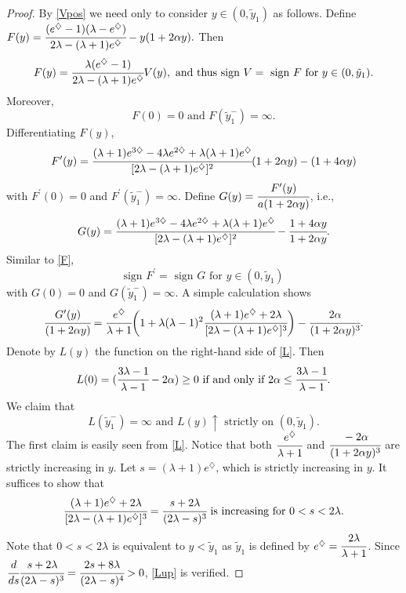 \documentclass[11pt]{article}
\begin{document}
\begin{proof}
By  \eqref{Vpos} we need only to consider  $y \in (0, \tilde y_1)$
as follows. Define $F(y)  =\cfrac{(
e^{\diamondsuit}-1)(\lambda-e^{\diamondsuit}) }{2 \lambda
-(\lambda+1)e^{\diamondsuit}}-y(1+2\alpha y).$ Then
\begin{equation}\label{F}
F(y)  = \cfrac{\lambda ( e^{\diamondsuit}-1)}{2 \lambda
-(\lambda+1)e^{\diamondsuit} } V(y),  \mbox{  and thus sign }V
=\mbox{ sign }F \mbox{ for } y \in (0, \tilde y_1).
\end{equation}
Moreover,
\begin{equation}\label{F0}
F(0)=0 \mbox{ and } F(\tilde y_1^{-}) = \infty.
\end{equation}
Differentiating $F(y)$,
$$
F^\prime(y)=\cfrac{(\lambda+1)e^{3\diamondsuit}-4\lambda
e^{2\diamondsuit}+\lambda(\lambda+1)e^{\diamondsuit}}{[2\lambda-(\lambda+1)e^{\diamondsuit}]^2}(1+2\alpha
y)-(1+4\alpha y)
$$
with $F^{\prime}(0)=0$ and $F^{\prime}(\tilde y_1^{-}) = \infty$.
Define $G(y)= \cfrac{F^{\prime}(y)}{a(1+2\alpha y)}$, i.e.,
\begin{equation}\label{G}
G(y)  =\cfrac{(\lambda+1)e^{3\diamondsuit}-4\lambda
e^{2\diamondsuit}+\lambda(\lambda+1)e^{\diamondsuit}}{[2\lambda-(\lambda+1)e^{\diamondsuit}]^2}-\cfrac{1+4\alpha
y}{1+2\alpha y}.
\end{equation}
Similar to  \eqref{F},
\begin{equation}\label{signG}
\mbox{sign }F^{\prime} =\mbox{ sign }G   \mbox{ for } y \in (0, \tilde y_1)
\end{equation}
with $G(0)=0$ and $G(\tilde y_1^{-}) = \infty$. A simple calculation shows
\begin{equation}\label{L}
\cfrac{G^\prime(y)}{(1+2\alpha
y)}=\cfrac{e^{\diamondsuit}}{\lambda+1}\bigg(1+\lambda(\lambda-1)^2\cfrac{(\lambda+1)e^{\diamondsuit}+2\lambda}
{[2\lambda-(\lambda+1)e^{\diamondsuit}]^3}\bigg)-\cfrac{2\alpha}{(1+2\alpha
y)^3}.
\end{equation}
Denote by $L(y)$ the function on the right-hand side of \eqref{L}.
Then
\begin{equation}\label{L0}
L(0)=(\cfrac{3\lambda-1}{\lambda-1}-2\alpha) \geq 0 \mbox{ if and
only if }  2\alpha   \leq \cfrac{3\lambda-1}{\lambda-1}.
\end{equation}
We claim that
\begin{equation}\label{Lup}
L(\tilde y_1^{-}) = \infty \mbox{ and } L(y) \uparrow \mbox{ strictly on } (0, \tilde y_1).
\end{equation}
The first claim is easily seen from \eqref{L}. Notice that both
$\cfrac{e^{\diamondsuit}}{\lambda+1}$ and
$\cfrac{-2\alpha}{(1+2\alpha y)^3}$ are strictly increasing in
$y$. Let  $s=(\lambda+1)e^\diamondsuit$, which is strictly
increasing in $y$. It suffices to show that
$$
\cfrac{(\lambda+1)e^{\diamondsuit}+2\lambda}{[2\lambda-(\lambda+1)e^{\diamondsuit}]^3}=\cfrac{s+2\lambda}{(2\lambda-s)^3}  \mbox{ is increasing for } 0<s< 2 \lambda.
$$
Note that $0<s< 2 \lambda$ is equivalent to $y<\tilde y_1$ as $\tilde y_1$ is defined by
$e^\diamondsuit=\cfrac{2\lambda}{\lambda+1}$.
Since   $\cfrac{d}{ds}   \cfrac{s+2\lambda}{(2\lambda-s)^3}  =\cfrac{2s+8\lambda}{(2\lambda-s)^4}>0$,  \eqref{Lup} is verified.


\end{proof}
\end{document}
